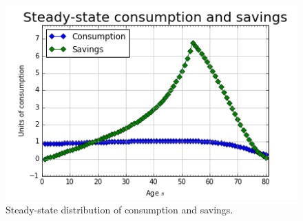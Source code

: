 \documentclass[letterpaper,12pt]{article}
\theoremstyle{definition}
\begin{document}
\begin{figure}[h!]
\centering
\includegraphics[scale=.8]{code/images/ss_bc}
\caption{Steady-state distribution of consumption and savings.}
\end{figure}
\end{document}
